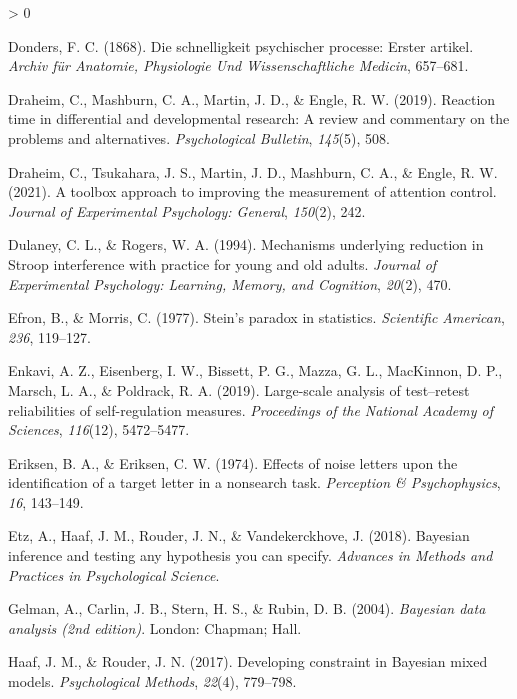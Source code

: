 \documentclass[
  english,
  ,man]{apa6}
\newlength{\cslhangindent}
\newenvironment{CSLReferences}[2] %
 {%
  \setlength{\parindent}{0pt}
  \ifodd #1 \everypar{\setlength{\hangindent}{\cslhangindent}}\ignorespaces\fi
  \ifnum #2 > 0
  \setlength{\parskip}{#2\baselineskip}
  \fi
 }%
 {}
\begin{document}
\begin{CSLReferences}{1}{0}
\leavevmode\hypertarget{ref-Donders.1868}{}%
Donders, F. C. (1868). Die schnelligkeit psychischer processe: {Erster} artikel. \emph{Archiv für Anatomie, Physiologie Und Wissenschaftliche Medicin}, 657--681.

\leavevmode\hypertarget{ref-Draheim:etal:2019}{}%
Draheim, C., Mashburn, C. A., Martin, J. D., \& Engle, R. W. (2019). Reaction time in differential and developmental research: A review and commentary on the problems and alternatives. \emph{Psychological Bulletin}, \emph{145}(5), 508.

\leavevmode\hypertarget{ref-Draheim.etal.2021}{}%
Draheim, C., Tsukahara, J. S., Martin, J. D., Mashburn, C. A., \& Engle, R. W. (2021). A toolbox approach to improving the measurement of attention control. \emph{Journal of Experimental Psychology: General}, \emph{150}(2), 242.

\leavevmode\hypertarget{ref-Dulaney.Rogers.1994}{}%
Dulaney, C. L., \& Rogers, W. A. (1994). Mechanisms underlying reduction in {Stroop} interference with practice for young and old adults. \emph{Journal of Experimental Psychology: Learning, Memory, and Cognition}, \emph{20}(2), 470.

\leavevmode\hypertarget{ref-Efron:Morris:1977}{}%
Efron, B., \& Morris, C. (1977). {S}tein's paradox in statistics. \emph{Scientific American}, \emph{236}, 119--127.

\leavevmode\hypertarget{ref-Enkavi.etal.2019}{}%
Enkavi, A. Z., Eisenberg, I. W., Bissett, P. G., Mazza, G. L., MacKinnon, D. P., Marsch, L. A., \& Poldrack, R. A. (2019). Large-scale analysis of test--retest reliabilities of self-regulation measures. \emph{Proceedings of the National Academy of Sciences}, \emph{116}(12), 5472--5477.

\leavevmode\hypertarget{ref-Eriksen:Eriksen:1974}{}%
Eriksen, B. A., \& Eriksen, C. W. (1974). Effects of noise letters upon the identification of a target letter in a nonsearch task. \emph{Perception \& Psychophysics}, \emph{16}, 143--149.

\leavevmode\hypertarget{ref-Etz:etal:2018}{}%
Etz, A., Haaf, J. M., Rouder, J. N., \& Vandekerckhove, J. (2018). Bayesian inference and testing any hypothesis you can specify. \emph{Advances in Methods and Practices in Psychological Science}.

\leavevmode\hypertarget{ref-Gelman:etal:2004}{}%
Gelman, A., Carlin, J. B., Stern, H. S., \& Rubin, D. B. (2004). \emph{{B}ayesian data analysis (2nd edition)}. London: Chapman; Hall.

\leavevmode\hypertarget{ref-Haaf:Rouder:2017}{}%
Haaf, J. M., \& Rouder, J. N. (2017). Developing constraint in {B}ayesian mixed models. \emph{Psychological Methods}, \emph{22}(4), 779--798.


\end{CSLReferences}
\end{document}
